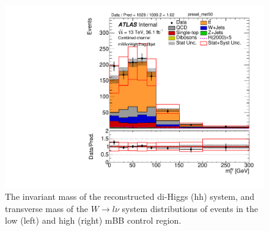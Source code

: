 \begin{figure}[!h]
\begin{center}
\includegraphics[scale=0.33]{./figures/boosted/PlotByMbbRegions/DataMC_2tag_0bjet_mbbcrHigh_lepton_presel_met50_WlepMtATLAS}                                                                        
\caption{The invariant mass of the reconstructed di-Higgs (hh) system, \met and transverse mass of the $W \to l\nu$ system 
distributions of events in the low (left) and high (right) mBB control region.}
\label{fig:boosted_mbbcrHighLow_mainplots}
\end{center}
\end{figure}

